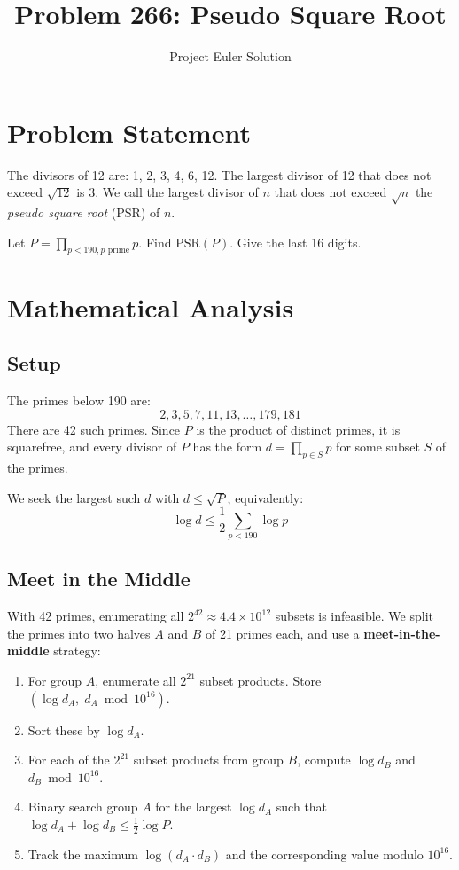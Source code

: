 \documentclass[12pt]{article}
\title{Problem 266: Pseudo Square Root}
\author{Project Euler Solution}
\date{}
\begin{document}
\maketitle

\section{Problem Statement}
The divisors of 12 are: 1, 2, 3, 4, 6, 12. The largest divisor of 12 that does not exceed $\sqrt{12}$ is 3. We call the largest divisor of $n$ that does not exceed $\sqrt{n}$ the \emph{pseudo square root} (PSR) of $n$.

Let $P = \prod_{p < 190, p \text{ prime}} p$. Find $\text{PSR}(P)$. Give the last 16 digits.

\section{Mathematical Analysis}

\subsection{Setup}
The primes below 190 are:
\[ 2, 3, 5, 7, 11, 13, \ldots, 179, 181 \]
There are 42 such primes. Since $P$ is the product of distinct primes, it is squarefree, and every divisor of $P$ has the form $d = \prod_{p \in S} p$ for some subset $S$ of the primes.

We seek the largest such $d$ with $d \leq \sqrt{P}$, equivalently:
\[ \log d \leq \frac{1}{2}\sum_{p < 190}\log p \]

\subsection{Meet in the Middle}
With 42 primes, enumerating all $2^{42} \approx 4.4 \times 10^{12}$ subsets is infeasible. We split the primes into two halves $A$ and $B$ of 21 primes each, and use a \textbf{meet-in-the-middle} strategy:

\begin{enumerate}
    \item For group $A$, enumerate all $2^{21}$ subset products. Store $(\log d_A, \; d_A \bmod 10^{16})$.
    \item Sort these by $\log d_A$.
    \item For each of the $2^{21}$ subset products from group $B$, compute $\log d_B$ and $d_B \bmod 10^{16}$.
    \item Binary search group $A$ for the largest $\log d_A$ such that $\log d_A + \log d_B \leq \frac{1}{2}\log P$.
    \item Track the maximum $\log(d_A \cdot d_B)$ and the corresponding value modulo $10^{16}$.
\end{enumerate}
\end{document}
